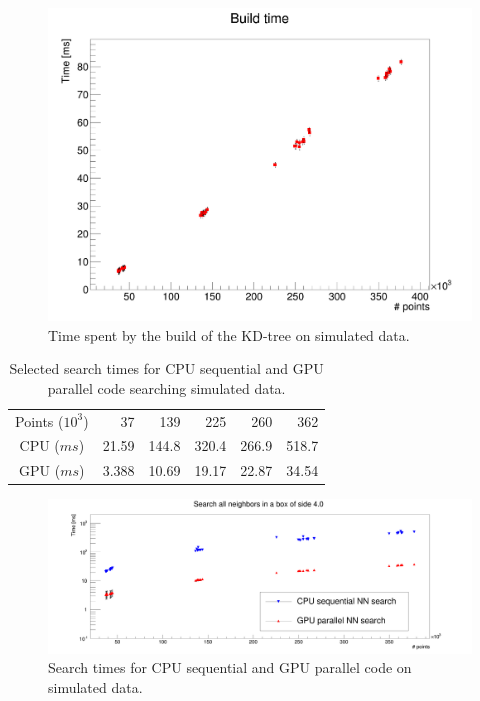\begin{figure}
\includegraphics[width=\textwidth]{rechits/BuildTimes.png}
\caption{Time spent by the build of the KD-tree on simulated data.}
\label{fkdtree_build_sim_times}
\end{figure}

\begin{center}
\begin{table}[h]
\begin{tabular}{ c || r r r r r }
Points ($10^{3}$) & 37 & 139 & 225 & 260 & 362\\
CPU ($\unit{ms}$) & 21.59 & 144.8 & 320.4 & 266.9 & 518.7\\
GPU ($\unit{ms}$) & 3.388 & 10.69 & 19.17 & 22.87 & 34.54\\
\end{tabular}
\caption{Selected search times for CPU sequential and GPU parallel code searching simulated data.}
\label{fkdtree_times_sim_tab}
\end{table}
\end{center}

\begin{figure}
\includegraphics[width=\textwidth]{rechits/SearchTimes.png}
\caption{Search times for CPU sequential and GPU parallel code on simulated data.}
\label{fkdtree_search_times}
\end{figure}

